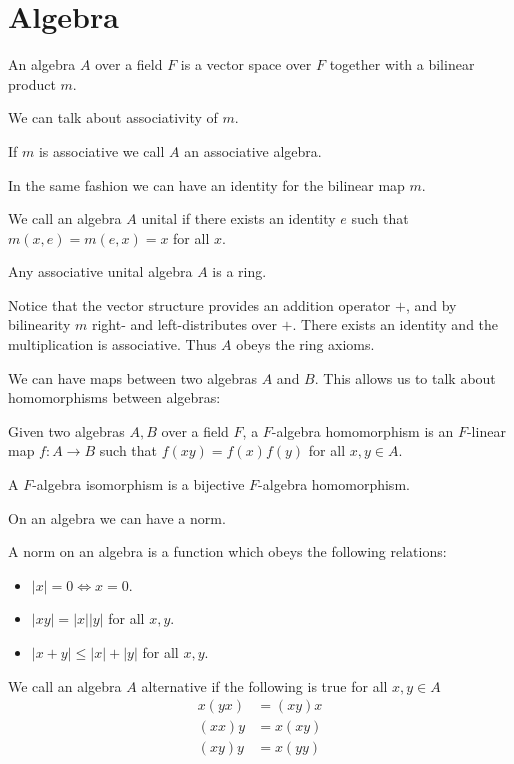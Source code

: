 \documentclass[../Thesis.tex]{subfiles}
\begin{document}
\section{Algebra}
\begin{mydef}
An algebra $A$ over a field $F$ is a vector space over $F$ together with a bilinear product $m$.
\end{mydef}
We can talk about associativity of $m$. 
\begin{mydef}
If $m$ is associative we call $A$ an associative algebra.
\end{mydef}
In the same fashion we can have an identity for the bilinear map $m$.
\begin{mydef}
We call an algebra $A$ unital if there exists an identity $e$ such that $m(x,e) = m(e,x) = x$ for all $x$.
\end{mydef}
\begin{lemma}
Any associative unital algebra $A$ is a ring.
\end{lemma}
\begin{myproof}
Notice that the vector structure provides an addition operator $+$, and by bilinearity $m$ right- and left-distributes over $+$. There exists an identity and the multiplication is associative. Thus $A$ obeys the ring axioms.
\end{myproof}
We can have maps between two algebras $A$ and $B$. This allows us to talk about homomorphisms between algebras:
\begin{mydef}
Given two algebras $A, B$ over a field $F$, a $F$-algebra homomorphism is an $F$-linear map $f: A \rightarrow B$ such that $f(xy) = f(x)f(y)$ for all $x,y \in A$.
\end{mydef}
\begin{mydef}
A $F$-algebra isomorphism is a bijective $F$-algebra homomorphism.
\end{mydef}
On an algebra we can have a norm. 
\begin{mydef}
A norm on an algebra is a function which obeys the following relations:
\begin{itemize}
\item $|x| = 0 \Leftrightarrow x = 0$.
\item $|xy| = |x| |y|$ for all $x, y$.
\item $|x + y| \leq |x| + |y|$ for all $x, y$.
\end{itemize}
\end{mydef}

\begin{mydef}
We call an algebra $A$ alternative if the following is true for all $x , y \in A$
\begin{align}
x(yx) &= (xy)x \\
(xx)y &= x(xy) \\
(xy)y &= x(yy) \\
\end{align}
\end{mydef}
\end{document}
